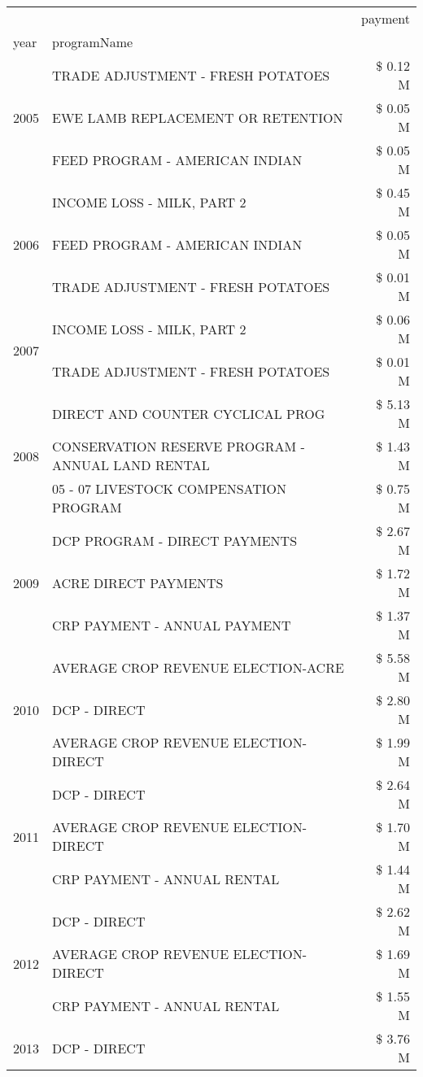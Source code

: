 \begin{tabular}{llr}
\toprule
 &  & payment \\
year & programName &  \\
\midrule
\multirow[t]{3}{*}{2005} & TRADE ADJUSTMENT - FRESH POTATOES & \$ 0.12 M \\
 & EWE LAMB REPLACEMENT OR RETENTION & \$ 0.05 M \\
 & FEED PROGRAM - AMERICAN INDIAN & \$ 0.05 M \\
\cline{1-3}
\multirow[t]{3}{*}{2006} & INCOME LOSS - MILK, PART 2 & \$ 0.45 M \\
 & FEED PROGRAM - AMERICAN INDIAN & \$ 0.05 M \\
 & TRADE ADJUSTMENT - FRESH POTATOES & \$ 0.01 M \\
\cline{1-3}
\multirow[t]{2}{*}{2007} & INCOME LOSS - MILK, PART 2 & \$ 0.06 M \\
 & TRADE ADJUSTMENT - FRESH POTATOES & \$ 0.01 M \\
\cline{1-3}
\multirow[t]{3}{*}{2008} & DIRECT AND COUNTER CYCLICAL PROG & \$ 5.13 M \\
 & CONSERVATION RESERVE PROGRAM - ANNUAL LAND RENTAL & \$ 1.43 M \\
 & 05 - 07 LIVESTOCK COMPENSATION PROGRAM & \$ 0.75 M \\
\cline{1-3}
\multirow[t]{3}{*}{2009} & DCP PROGRAM - DIRECT PAYMENTS & \$ 2.67 M \\
 & ACRE DIRECT PAYMENTS & \$ 1.72 M \\
 & CRP PAYMENT - ANNUAL PAYMENT & \$ 1.37 M \\
\cline{1-3}
\multirow[t]{3}{*}{2010} & AVERAGE CROP REVENUE ELECTION-ACRE & \$ 5.58 M \\
 & DCP - DIRECT & \$ 2.80 M \\
 & AVERAGE CROP REVENUE ELECTION-DIRECT & \$ 1.99 M \\
\cline{1-3}
\multirow[t]{3}{*}{2011} & DCP - DIRECT & \$ 2.64 M \\
 & AVERAGE CROP REVENUE ELECTION-DIRECT & \$ 1.70 M \\
 & CRP PAYMENT - ANNUAL RENTAL & \$ 1.44 M \\
\cline{1-3}
\multirow[t]{3}{*}{2012} & DCP - DIRECT & \$ 2.62 M \\
 & AVERAGE CROP REVENUE ELECTION-DIRECT & \$ 1.69 M \\
 & CRP PAYMENT - ANNUAL RENTAL & \$ 1.55 M \\
\cline{1-3}
\multirow[t]{3}{*}{2013} & DCP - DIRECT & \$ 3.76 M \\

\end{tabular}
